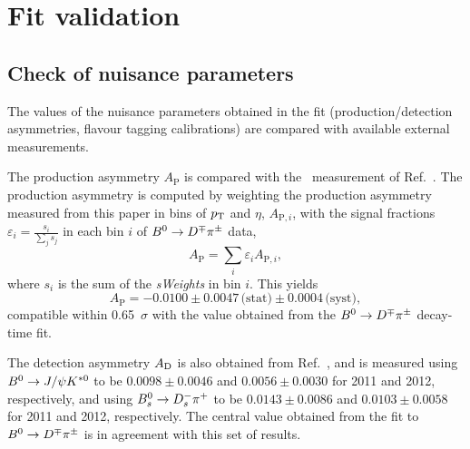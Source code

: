 \section{Fit validation}
\label{sec:timefitvalidation}

\subsection{Check of nuisance parameters}

The values of the nuisance parameters obtained in the fit (production/detection asymmetries, flavour tagging calibrations) are compared with available
external measurements.

The production asymmetry $A_{\mathrm{P}}$ is compared with the \lhcb~measurement of
Ref.~\cite{LHCb-PAPER-2016-062}. The production asymmetry is computed by weighting
the production asymmetry measured from this paper in bins of $\mbox{$p_{\rm T}$}$ and $\eta$,
$A_{\mathrm{P},i}$, with the signal fractions $\varepsilon_i = \frac{s_i}{\sum_j s_j}$
in each bin $i$ of $B^0\rightarrow D^\mp\pi^\pm$ data,
%
\begin{equation}
	A_{\mathrm{P}} = \sum_i \varepsilon_i A_{\mathrm{P},i},
\end{equation}
%
where $s_i$ is the sum of the \emph{sWeights} in bin $i$. This yields
%
\begin{equation}
        \label{eq:prodAsymm}
	A_{\mathrm{P}} =  -0.0100 \pm 0.0047\,\text{(stat)} \pm 0.0004\, \text{(syst)},
\end{equation}
compatible within 0.65~$\sigma$ with the value obtained from the $B^0\rightarrow D^\mp\pi^\pm$ decay-time fit.

The detection asymmetry $A_{\rm D}$ is also obtained from Ref.~\cite{LHCb-PAPER-2016-062},
and is measured using $B^0\rightarrow J/\psi K^{*0}$ to be $0.0098 \pm 0.0046$ and
$0.0056 \pm 0.0030$ for \num{2011} and \num{2012}, respectively, and using $B^0_s\rightarrow D^-_s\pi^+$ to be
$0.0143 \pm 0.0086$ and $0.0103 \pm 0.0058$ for \num{2011} and \num{2012}, respectively.
The central value obtained from the fit to $B^0\rightarrow D^\mp\pi^\pm$ is in agreement with this set of results.

